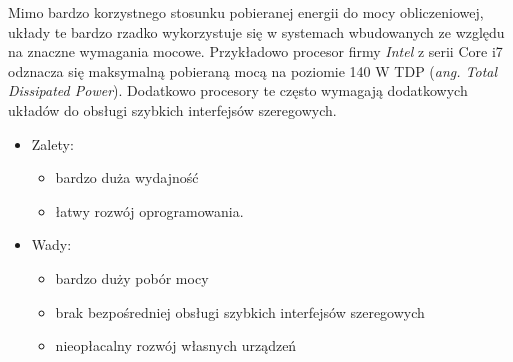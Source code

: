 Mimo bardzo korzystnego stosunku pobieranej energii do mocy obliczeniowej, układy te bardzo rzadko wykorzystuje się w systemach wbudowanych ze względu na znaczne wymagania mocowe. Przykładowo procesor firmy \textit{Intel} z serii Core i7 odznacza się maksymalną pobieraną mocą na poziomie 140 W TDP (\textit{ang. Total Dissipated Power}). Dodatkowo procesory te często wymagają dodatkowych układów do obsługi szybkich interfejsów szeregowych.  

\begin{itemize}
\item Zalety:
\begin{itemize}
\item bardzo duża wydajność
\item łatwy rozwój oprogramowania.
\end{itemize}

\item Wady:
\begin{itemize}
\item bardzo duży pobór mocy
\item brak bezpośredniej obsługi szybkich interfejsów szeregowych
\item nieopłacalny rozwój własnych urządzeń
\end{itemize}

\end{itemize}


